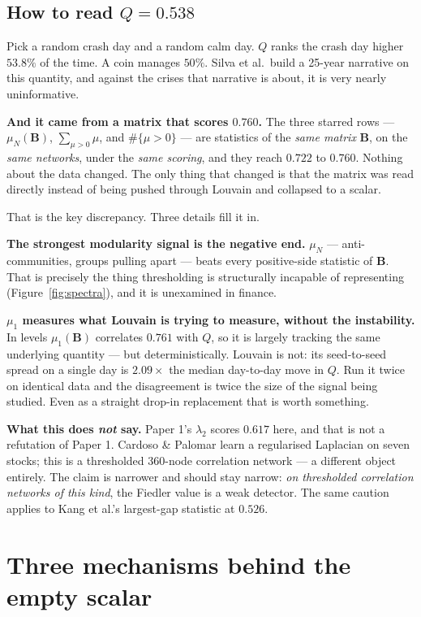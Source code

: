 \documentclass[11pt,a4paper]{article}
\newcommand{\Q}{Q}
\newcommand{\Bmat}{\mathbf{B}}
\begin{document}
\subsection{How to read \texorpdfstring{$\Q=0.538$}{Q = 0.538}}

Pick a random crash day and a random calm day. $\Q$ ranks the crash day higher
$53.8\%$ of the time. A coin manages $50\%$. Silva et al.\ build a 25-year
narrative on this quantity, and against the crises that narrative is about, it
is very nearly uninformative.

\textbf{And it came from a matrix that scores $0.760$.} The three starred rows
--- $\mu_N(\Bmat)$, $\sum_{\mu>0}\mu$, and $\#\{\mu>0\}$ --- are statistics of
the \emph{same matrix} $\Bmat$, on the \emph{same networks}, under the
\emph{same scoring}, and they reach $0.722$ to $0.760$. Nothing about the data
changed. The only thing that changed is that the matrix was read directly
instead of being pushed through Louvain and collapsed to a scalar.

That is the key discrepancy. Three details fill it in.

\textbf{The strongest modularity signal is the negative end.} $\mu_N$ ---
anti-communities, groups pulling apart --- beats every positive-side statistic
of $\Bmat$. That is precisely the thing thresholding is structurally incapable
of representing (Figure~\ref{fig:spectra}), and it is unexamined in finance.

\textbf{$\mu_1$ measures what Louvain is trying to measure, without the
instability.} In levels $\mu_1(\Bmat)$ correlates $0.761$ with $\Q$, so it is
largely tracking the same underlying quantity --- but deterministically. Louvain
is not: its seed-to-seed spread on a single day is $2.09\times$ the median
day-to-day move in $\Q$. Run it twice on identical data and the disagreement is
twice the size of the signal being studied. Even as a straight drop-in
replacement that is worth something.

\textbf{What this does \emph{not} say.} Paper 1's $\lambda_2$ scores $0.617$
here, and that is not a refutation of Paper 1. Cardoso \& Palomar learn a
regularised Laplacian on seven stocks; this is a thresholded 360-node
correlation network --- a different object entirely. The claim is narrower and
should stay narrow: \emph{on thresholded correlation networks of this kind}, the
Fiedler value is a weak detector. The same caution applies to Kang et al.'s
largest-gap statistic at $0.526$.

\section{Three mechanisms behind the empty scalar}
\label{sec:mech}
\end{document}
